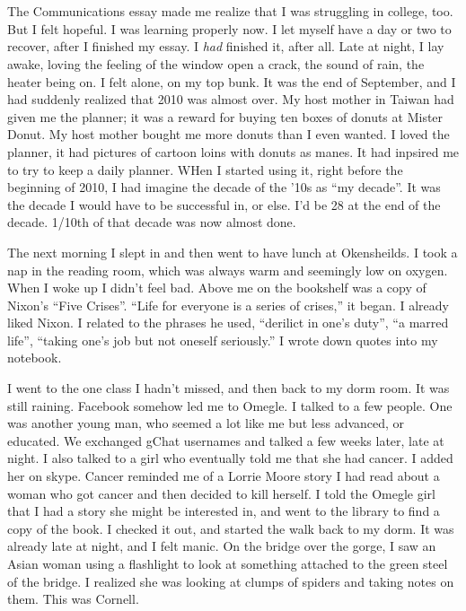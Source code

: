 \section{}

The Communications essay made me realize that I was struggling in college, too.
But I felt hopeful. I was learning properly now.  I let myself have a  day or
two to recover, after I finished my essay.  I \textit{had} finished it, after
all.  Late at night, I lay awake, loving the feeling of the window open a crack,
the sound of rain, the heater being on.  I felt alone, on my top bunk.  It was
the end of September, and I had suddenly realized that 2010 was almost over.  My
host mother in Taiwan had given me the planner; it was a reward for buying ten
boxes of donuts at Mister Donut.  My host mother bought me more donuts than I
even wanted.  I loved the planner, it had pictures of cartoon loins with donuts
as manes.  It had inpsired me to try to keep a daily planner.  WHen I started
using it, right before the beginning of 2010, I had imagine the decade of the
'10s as ``my decade''.  It was the decade I would have to be successful in, or
else.  I'd be 28 at the end of the decade.  1/10th of that decade was now almost
done.

The next morning I slept in and then went to have lunch at Okensheilds.  I took
a nap in the reading room, which was always warm and seemingly low on oxygen.
When I woke up I didn't feel bad.  Above me on the bookshelf was a copy of
Nixon's ``Five Crises''.  ``Life for everyone is a series of crises,'' it began.
I already liked Nixon.  I related to the phrases he used, ``derilict in one's
duty'', ``a marred life'', ``taking one's job but not oneself seriously.''  I
wrote down quotes into my notebook.

I went to the one class I hadn't missed, and then back to my dorm room.  It was
still raining.  Facebook somehow led me to Omegle.  I talked to a few people.
One was another young man, who seemed a lot like me but less advanced, or
educated.  We exchanged gChat usernames and talked a few weeks later, late at
night.  I also talked to a girl who eventually told me that she had cancer.  I
added her on skype.  Cancer reminded me of a Lorrie Moore story I had read about
a woman who got cancer and then decided to kill herself.  I told the Omegle girl
that I had a story she might be interested in, and went to the library to find a
copy of the book.  I checked it out, and started the walk back to my dorm.  It
was already late at night, and I felt manic.  On the bridge over the gorge, I
saw an Asian woman using a flashlight to look at something attached to the green
steel of the bridge.  I realized she was looking at clumps of spiders and taking
notes on them.  This was Cornell.

